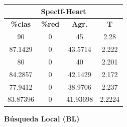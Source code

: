 \documentclass[11pt,a4paper]{article}
\theoremstyle{definition}
\begin{document}
\begin{tabbing}
{		\begin{tabular}{|c|c|c|c|}
			\hline
			\multicolumn{4}{|c|}{\textbf{Spectf-Heart}} \\ \hline
			\textbf{\%clas} & \textbf{\%red} & \textbf{Agr.} & \textbf{T} \\ \hline 
			90	      &0	&45	      &2.28\\ \hline
87.1429	  &0	&43.5714	  &2.222\\ \hline
80	      &0	&40	      &2.201\\ \hline
84.2857	  &0	&42.1429	  &2.172 \\ \hline
77.9412	  &0	&38.9706	  &2.237 \\ \hline
83.87396	&0	&41.93698	&2.2224\\ \hline

		\end{tabular}
		}
	\end{tabbing}
	
	\textbf{Búsqueda Local (BL)}
	
\end{document}
